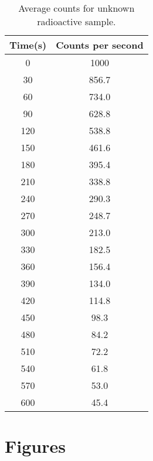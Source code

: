 \documentclass[11pt,a4paper]{article}
\begin{document}
\begin{table}[h!]
    \centering
    \caption{Average counts for unknown radioactive sample.}
        \begin{tabular}{|c|c|}
            \hline
            Time(s)
            &Counts per second
            \\
            \hline
            0
            &1000
            \\
            30
            &856.7
            \\
            60
            &734.0
            \\
            90
            &628.8
            \\
            120
            &538.8
            \\
            150
            &461.6
            \\
            180
            &395.4
            \\
            210
            &338.8
            \\
            240
            &290.3
            \\
            270
            &248.7
            \\
            300
            &213.0
            \\
            330
            &182.5
            \\
            360
            &156.4
            \\
            390
            &134.0
            \\
            420
            &114.8
            \\
            450
            &98.3
            \\
            480
            &84.2
            \\
            510
            &72.2
            \\
            540
            &61.8
            \\
            570
            &53.0
            \\
            600
            &45.4
            \\
            \hline
        \end{tabular}
    \label{tab-half-life}
\end{table}

\newpage

\newpage

\section*{Figures}
\end{document}
